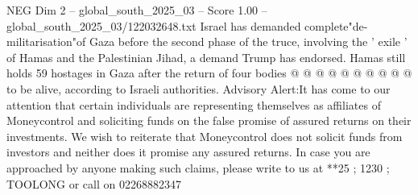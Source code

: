 \begin{textsample}{NEG Dim 2 – global\_south\_2025\_03 – Score 1.00 – global\_south\_2025\_03/122032648.txt}
Israel has demanded complete"de-militarisation"of Gaza before the second phase of the truce, involving the ' exile ' of Hamas and the Palestinian Jihad, a demand Trump has endorsed.
Hamas still holds 59 hostages in Gaza after the return of four bodies @ @ @ @ @ @ @ @ @ @ to be alive, according to Israeli authorities.
Advisory Alert:It has come to our attention that certain individuals are representing themselves as affiliates of Moneycontrol and soliciting funds on the false promise of assured returns on their investments.
We wish to reiterate that Moneycontrol does not solicit funds from investors and neither does it promise any assured returns.
In case you are approached by anyone making such claims, please write to us at **25 ; 1230 ; TOOLONG or call on 02268882347

\end{textsample}
